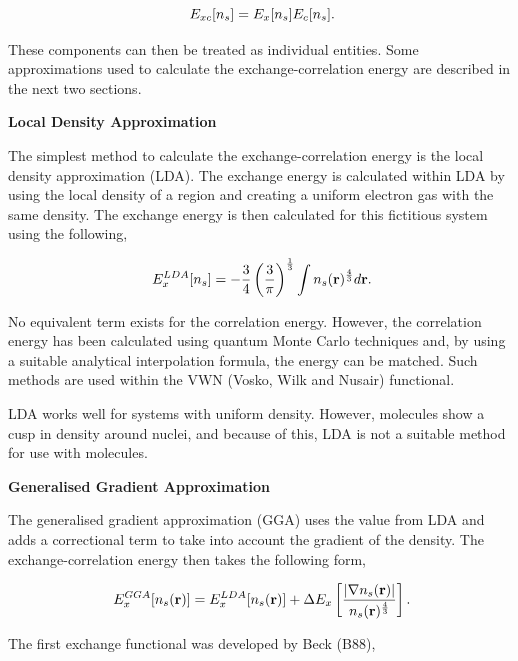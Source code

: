 \begin{equation}
\ E_{xc}[n_s] = E_x [n_s] E_c[n_s] \\.
\end{equation}

These components can then be treated as individual entities.  Some approximations used to calculate the exchange-correlation energy are described in the next two sections.


\textbf{Local Density Approximation}

The simplest method to calculate the exchange-correlation energy is the local density approximation (LDA).  The exchange energy is calculated within LDA by using the local density of a region and creating a uniform electron gas with the same density.  The exchange energy is then calculated for this fictitious system using the following,

\begin{equation}
\ E^{LDA}_{x}[n_s] = - \frac{3}{4} \left( \frac{3}{\pi} \right)^{\frac{1}{3}} \int n_{s}(\mathbf{r})^{\frac{4}{3}} d \mathbf{r} \\.
\end{equation}

No equivalent term exists for the correlation energy\cite{cramer_chem}.  However, the correlation energy has been calculated using quantum Monte Carlo techniques and, by using a suitable analytical interpolation formula, the energy can be matched\cite{jensen_quantum}.  Such methods are used within the VWN (Vosko, Wilk and Nusair)\cite{VMN_LDA} functional.

LDA works well for systems with uniform density.  However, molecules show a cusp in density around nuclei, and because of this, LDA is not a suitable method for use with molecules.

\textbf{Generalised Gradient Approximation}

The generalised gradient approximation (GGA) uses the value from LDA and adds a correctional term to take into account the gradient of the density.  The exchange-correlation energy then takes the following form,

\begin{equation}
\ E^{GGA}_{x}[n_s(\mathbf{r})] = E^{LDA}_{x}[n_s(\mathbf{r})] + \Delta E_{x}\left[ \frac{| \nabla n_s(\mathbf{r}) |}{n_s(\mathbf{r})^{\frac{4}{3}}} \right] \\.
\end{equation}

The first exchange functional was developed by Beck (B88)\cite{B88_GGA}, 

